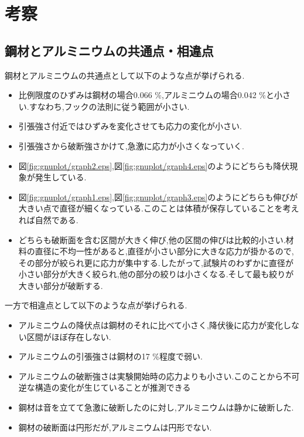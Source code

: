 \section{考察}
\subsection{鋼材とアルミニウムの共通点・相違点}
鋼材とアルミニウムの共通点として以下のような点が挙げられる.
\begin{itemize}
  \item 比例限度のひずみは鋼材の場合0.066 \%,アルミニウムの場合0.042 \%と小さい.すなわち,フックの法則に従う範囲が小さい.
  \item 引張強さ付近ではひずみを変化させても応力の変化が小さい.
  \item 引張強さから破断強さかけて,急激に応力が小さくなっていく.
  \item 図\ref{fig:gnuplot/graph2.eps},図\ref{fig:gnuplot/graph4.eps}のようにどちらも降伏現象が発生している.
  \item 図\ref{fig:gnuplot/graph1.eps},図\ref{fig:gnuplot/graph3.eps}のようにどちらも伸びが大きい点で直径が細くなっている.このことは体積が保存していることを考えれば自然である.
  \item どちらも破断面を含む区間が大きく伸び,他の区間の伸びは比較的小さい.材料の直径に不均一性があると,直径が小さい部分に大きな応力が掛かるので,その部分が絞られ更に応力が集中する.したがって,試験片のわずかに直径が小さい部分が大きく絞られ,他の部分の絞りは小さくなる.そして最も絞りが大きい部分が破断する.
\end{itemize}
一方で相違点として以下のような点が挙げられる.
\begin{itemize}
  \item アルミニウムの降伏点は鋼材のそれに比べて小さく,降伏後に応力が変化しない区間がほぼ存在しない.
  \item アルミニウムの引張強さは鋼材の17 \%程度で弱い.
  \item アルミニウムの破断強さは実験開始時の応力よりも小さい.このことから不可逆な構造の変化が生じていることが推測できる
  \item 鋼材は音を立てて急激に破断したのに対し,アルミニウムは静かに破断した.
  \item 鋼材の破断面は円形だが,アルミニウムは円形でない.
\end{itemize}
